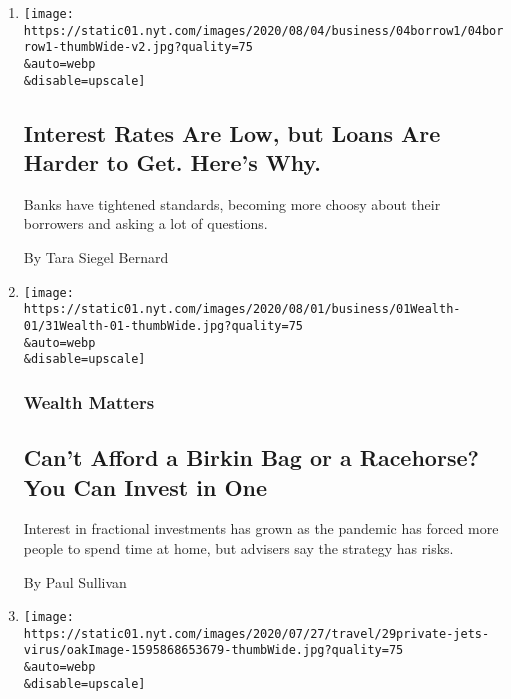 \begin{enumerate}
\def\labelenumi{\arabic{enumi}.}
\item
  \href{/2020/08/04/your-money/mortgage-loans-credit-cards-coronavirus.html}{}

  \texttt{[image: https://static01.nyt.com/images/2020/08/04/business/04borrow1/04borrow1-thumbWide-v2.jpg?quality=75\\\&auto=webp\\\&disable=upscale]}

  \hypertarget{interest-rates-are-low-but-loans-are-harder-to-get-heres-why}{%
  \subsection{Interest Rates Are Low, but Loans Are Harder to Get.
  Here's
  Why.}\label{interest-rates-are-low-but-loans-are-harder-to-get-heres-why}}

  Banks have tightened standards, becoming more choosy about their
  borrowers and asking a lot of questions.

  By Tara Siegel Bernard
\item
  \href{/2020/07/31/your-money/birkin-bag-racehorse-invest.html}{}

  \texttt{[image: https://static01.nyt.com/images/2020/08/01/business/01Wealth-01/31Wealth-01-thumbWide.jpg?quality=75\\\&auto=webp\\\&disable=upscale]}

  \hypertarget{wealth-matters}{%
  \subsubsection{Wealth Matters}\label{wealth-matters}}

  \hypertarget{cant-afford-a-birkin-bag-or-a-racehorse-you-can-invest-in-one}{%
  \subsection{Can't Afford a Birkin Bag or a Racehorse? You Can Invest
  in
  One}\label{cant-afford-a-birkin-bag-or-a-racehorse-you-can-invest-in-one}}

  Interest in fractional investments has grown as the pandemic has
  forced more people to spend time at home, but advisers say the
  strategy has risks.

  By Paul Sullivan
\item
  \href{/2020/07/30/travel/private-jets-coronavirus.html}{}

  \texttt{[image: https://static01.nyt.com/images/2020/07/27/travel/29private-jets-virus/oakImage-1595868653679-thumbWide.jpg?quality=75\\\&auto=webp\\\&disable=upscale]}


\end{enumerate}
